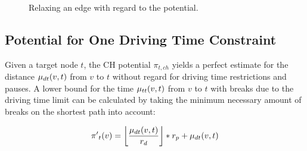 \begin{figure}[hbtp]
	\setlength{\interspacetitleruled}{0pt}%
	\setlength{\algotitleheightrule}{0pt}%
	\begin{algorithm*}[H]
		\DontPrintSemicolon



	\end{algorithm*}
	\setlength{\interspacetitleruled}{2pt}%
	\setlength{\algotitleheightrule}{\algotitleheightruledefault}%

	\caption{\label{alg:relax_edge_a_star} Relaxing an edge with regard to the potential.}
\end{figure}

\subsection{Potential for One Driving Time Constraint}\label{section:potential_csp}
Given a target node $t$, the CH potential $\pi_{t,ch}$ yields a perfect estimate for the distance $\drivingtime(v,t)$ from $v$ to $t$ without regard for driving time restrictions and pauses. A lower bound for the time $\traveltime(v,t)$ from $v$ to $t$ with breaks due to the driving time limit can be calculated by taking the minimum necessary amount of breaks on the shortest path into account:

\[\pi{'}_t(v) = \floor*{ \frac{\drivingtime(v,t)}{\restr_d} } * \restr_p + \drivingtime(v,t)\]

